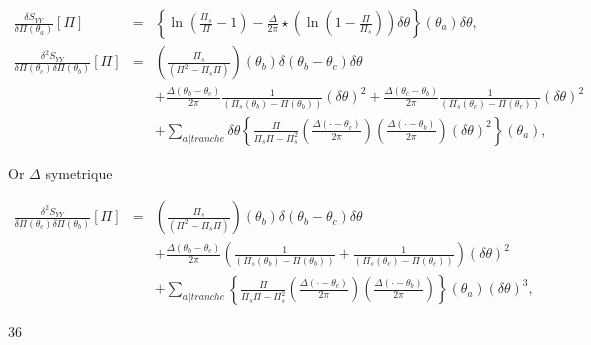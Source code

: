 {	\begin{eqnarray}
		\frac{ \delta S_{YY} }{ \delta \Pi(\theta_a)  } [\Pi ]  & = &   \left \{ \ln \left ( \frac{ \Pi_s }{ \Pi  } - 1 \right )   -  \frac{ \Delta}{2\pi}  \star \left ( \ln \left ( 1 - \frac{ \Pi}{ \Pi_s }\right ) \right ) \delta \theta \right \} (\theta_a) \delta \theta , \\
		\frac{ \delta^2 S_{YY} }{ \delta \Pi(\theta_c) \delta \Pi(\theta_b)  } [\Pi ]  & = &   \left (  \frac{\Pi_s}{(\Pi^2  - \Pi_s\Pi)}    \right )(\theta_b) \delta( \theta_b - \theta_c)  \delta \theta  \\
		&  &   +   \frac{ \Delta ( \theta_b - \theta_c)}{ 2\pi}  \frac{1 }{(\Pi_s(\theta_b) -\Pi(\theta_b)) } (\delta \theta)^2 +  \frac{\Delta ( \theta_c - \theta_b )}{2\pi}\frac{1 }{( \Pi_s(\theta_c)  -   \Pi(\theta_c) ) }(\delta \theta)^2  \\
		& &  + \sum_{a \vert tranche}   \delta \theta \left \{  \frac{\Pi }{\Pi_s\Pi - \Pi_s^2 }\left (  \frac{\Delta ( \cdot - \theta_c )}{2\pi} \right )\left (  \frac{\Delta ( \cdot - \theta_b )}{2\pi} \right )( \delta \theta)^2  \right \}(\theta_a) ,	 	
	\end{eqnarray}
	
	

		
	 Or $\Delta$ symetrique 
		
	\begin{eqnarray}
		\frac{ \delta^2 S_{YY} }{ \delta \Pi(\theta_c) \delta \Pi(\theta_b)  } [\Pi ]  & = &   \left (  \frac{\Pi_s}{(\Pi^2  - \Pi_s\Pi)}    \right )(\theta_b) \delta( \theta_b - \theta_c)  \delta \theta  \\
		&  &  +   \frac{ \Delta ( \theta_b - \theta_c)}{ 2\pi} \left (  \frac{1 }{(\Pi_s(\theta_b) -\Pi(\theta_b)) }  +  \frac{1 }{( \Pi_s(\theta_c)  -   \Pi(\theta_c) ) } \right )(\delta \theta)^2  \\
		& & + \sum_{a \vert tranche}   \left \{  \frac{\Pi }{\Pi_s\Pi - \Pi_s^2 }\left (  \frac{\Delta ( \cdot - \theta_c )}{2\pi} \right )\left (  \frac{\Delta ( \cdot - \theta_b )}{2\pi} \right )  \right \}(\theta_a)( \delta \theta)^3 ,		
	\end{eqnarray}
	
	}
	
36